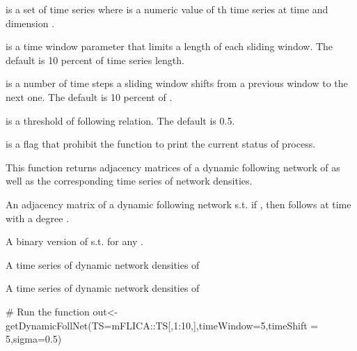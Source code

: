 \documentclass[a4paper]{book}
\begin{document}
\begin{Arguments}
\begin{ldescription}
\item[\code{TS}] is a set of time series where  is a numeric value of th time series at time  and dimension .

\item[\code{timeWindow}] is a time window parameter that limits a length of each sliding window. The default is 10 percent of time series length.

\item[\code{timeShift}] is a number of time steps a sliding window shifts from a previous window to the next one. The default is 10 percent of .

\item[\code{sigma}] is a threshold of following relation. The default is 0.5.

\item[\code{silentFlag}] is a flag that prohibit the function to print the current status of process.
\end{ldescription}
\end{Arguments}
%
\begin{Value}
This function returns adjacency matrices of a dynamic following network of  as well as the corresponding time series of network densities.

\begin{ldescription}
\item[\code{dyNetWeightedMat}]  An adjacency matrix of a dynamic following network
s.t. if , then  follows   at time  with a degree . 
\item[\code{dyNetBinMat}]  A binary version of  s.t.  for any .  
\item[\code{dyNetWeightedDensityVec}] A time series of dynamic network densities of 
\item[\code{dyNetBinDensityVec}] A time series of dynamic network densities of 
\end{ldescription}
\end{Value}
%
\begin{Examples}
\begin{ExampleCode}

# Run the function
out<-getDynamicFollNet(TS=mFLICA::TS[,1:10,],timeWindow=5,timeShift = 5,sigma=0.5)

\end{ExampleCode}
\end{Examples}
\end{document}
